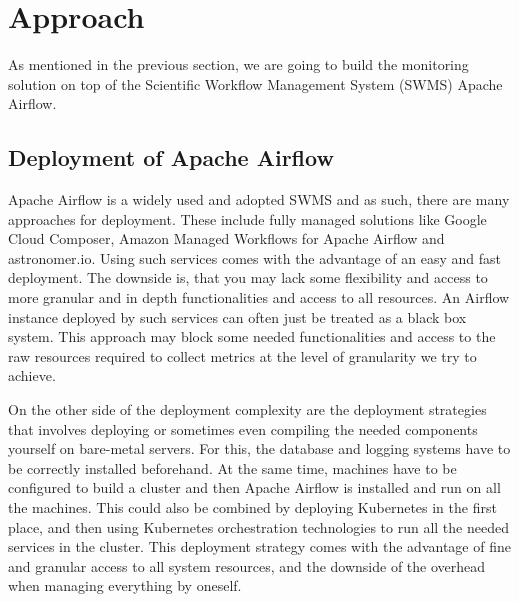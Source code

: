 \documentclass[a4paper,journal]{IEEEtran}
\begin{document}
	\section{Approach}
	As mentioned in the previous section, we are going to build the monitoring solution on top of the Scientific Workflow Management System (SWMS) Apache Airflow. 
	
	\subsection{Deployment of Apache Airflow}
	Apache Airflow is a widely used and adopted SWMS and as such, there are many approaches for deployment. These include fully managed solutions like Google Cloud Composer, Amazon Managed Workflows for Apache Airflow and astronomer.io. Using such services comes with the advantage of an easy and fast deployment. The downside is, that you may lack some flexibility and access to more granular and in depth functionalities and access to all resources. An Airflow instance deployed by such services can often just be treated as a black box system. This approach may block some needed functionalities and access to the raw resources required to collect metrics at the level of granularity we try to achieve.
	
	On the other side of the deployment complexity are the deployment strategies that involves deploying or sometimes even compiling the needed components yourself on bare-metal servers. For this, the database and logging systems have to be correctly installed beforehand. At the same time, machines have to be configured to build a cluster and then Apache Airflow is installed and run on all the machines. This could also be combined by deploying Kubernetes in the first place, and then using Kubernetes orchestration technologies to run all the needed services in the cluster. This deployment strategy comes with the advantage of fine and granular access to all system resources, and the downside of the overhead when managing everything by oneself. 
	
	
\end{document}
